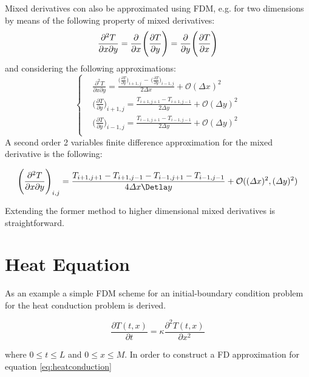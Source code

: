 Mixed derivatives con also be approximated using FDM, e.g. for two dimensions by means of the following property of mixed derivatives:
\begin{equation}
\frac{\partial ^2 T}{\partial x \partial y} = \frac{\partial}{\partial x} \Bigg{(}\frac{\partial T}{\partial y}\Bigg{)} = \frac{\partial}{\partial y} \Bigg{(}\frac{\partial T}{\partial x}\Bigg{)}\\
\end{equation}
and considering the following approximations:
\begin{equation}
\begin{cases}
&\frac{\partial ^2 T}{\partial x \partial y} = 
\frac{\bigl(\frac{\partial T}{ \partial y}\bigr)_{i+1,j}\, - \,
	\bigl(\frac{\partial T}{ \partial y}\bigr)_{i-1,j}
}{2\Delta x} +\mathcal{O}(\Delta x)^2 \\
&\bigl(\frac{\partial T}{\partial y}\bigr)_{i+1,j} = \frac{T_{i+1,j+1} -T_{i+1,j-1}}{2\Delta y}+\mathcal{O}(\Delta y)^2 \\
&\bigl(\frac{\partial T}{\partial y}\bigr)_{i-1,j} = \frac{T_{i-1,j+1} -T_{i-1,j-1}}{2\Delta y}+\mathcal{O}(\Delta y)^2 \\
\end{cases}
\end{equation}
A second order 2 variables finite difference approximation for the mixed derivative is the following:

\begin{equation}
\Bigg{(}\frac{\partial ^2 T}{\partial x \partial y}\Bigg{)}_{i,j}= \frac{T_{i+1,j+1} -T_{i+1,j-1} - T_{i-1,j+1} -T_{i-1,j-1}}{4\Delta x \Detla y} +\mathcal{O}((\Delta x)^2,(\Delta y)^2)
\end{equation}

Extending the former method to higher dimensional mixed derivatives is straightforward.
    \section{Heat Equation}
        As an example a simple FDM scheme for an initial-boundary condition problem for the heat conduction problem is derived. 
    
\begin{equation}
    \frac{\partial T(t,x)}{\partial t}= \kappa\frac{\partial^2
      T(t,x)}{\partial x^2}
      \label{eq:heatconduction}
\end{equation}
 
    where $0 \leq t \leq L$ and $0 \leq x \leq
    M$. 
 In order to construct a FD approximation for equation \ref{eq:heatconduction} 
 
